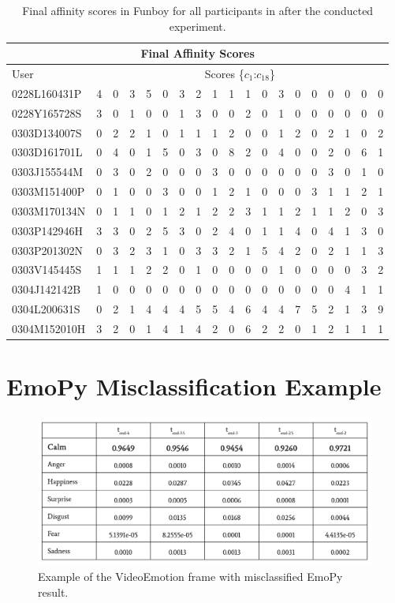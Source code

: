 \begin{table}[hbt!]
\centering
\begin{tabular}{|l|l|l|l|l|l|l|l|l|l|l|l|l|l|l|l|l|l|l|}
\hline
\multicolumn{19}{|c|}{Final Affinity Scores}                                         \\ \hline
User & \multicolumn{18}{c|}{Scores \{\(c_1\):\(c_{18}\)\}}                   \\ \hline
0228L160431P & 4 & 0 & 3 & 5 & 0 & 3 & 2 & 1 & 1 & 1 & 0 & 3 & 0 & 0 & 0 & 0 & 0 & 0 \\ \hline
0228Y165728S & 3 & 0 & 1 & 0 & 0 & 1 & 3 & 0 & 0 & 2 & 0 & 1 & 0 & 0 & 0 & 0 & 0 & 0 \\ \hline
0303D134007S & 0 & 2 & 2 & 1 & 0 & 1 & 1 & 1 & 2 & 0 & 0 & 1 & 2 & 0 & 2 & 1 & 0 & 2 \\ \hline
0303D161701L & 0 & 4 & 0 & 1 & 5 & 0 & 3 & 0 & 8 & 2 & 0 & 4 & 0 & 0 & 2 & 0 & 6 & 1 \\ \hline
0303J155544M & 0 & 3 & 0 & 2 & 0 & 0 & 0 & 3 & 0 & 0 & 0 & 0 & 0 & 0 & 3 & 0 & 1 & 0 \\ \hline
0303M151400P & 0 & 1 & 0 & 0 & 3 & 0 & 0 & 1 & 2 & 1 & 0 & 0 & 0 & 3 & 1 & 1 & 2 & 1 \\ \hline
0303M170134N & 0 & 1 & 1 & 0 & 1 & 2 & 1 & 2 & 2 & 3 & 1 & 1 & 2 & 1 & 1 & 2 & 0 & 3 \\ \hline
0303P142946H & 3 & 3 & 0 & 2 & 5 & 3 & 0 & 2 & 4 & 0 & 1 & 1 & 4 & 0 & 4 & 1 & 3 & 0 \\ \hline
0303P201302N & 0 & 3 & 2 & 3 & 1 & 0 & 3 & 3 & 2 & 1 & 5 & 4 & 2 & 0 & 2 & 1 & 1 & 3 \\ \hline
0303V145445S & 1 & 1 & 1 & 2 & 2 & 0 & 1 & 0 & 0 & 0 & 0 & 1 & 0 & 0 & 0 & 0 & 3 & 2 \\ \hline
0304J142142B & 1 & 0 & 0 & 0 & 0 & 0 & 0 & 0 & 0 & 0 & 0 & 0 & 0 & 0 & 0 & 4 & 1 & 1 \\ \hline
0304L200631S & 0 & 2 & 1 & 4 & 4 & 4 & 5 & 5 & 4 & 6 & 4 & 4 & 7 & 5 & 2 & 1 & 3 & 9 \\ \hline
0304M152010H & 3 & 2 & 0 & 1 & 4 & 1 & 4 & 2 & 0 & 6 & 2 & 2 & 0 & 1 & 2 & 1 & 1 & 1 \\ \hline
\end{tabular}
\caption{Final affinity scores in Funboy for all participants in after the conducted experiment.}
\label{table:fas1}
\end{table}

\chapter{EmoPy Misclassification Example}\label{appendix:emopy}

\begin{figure}[htpb]
  \centering
  \includegraphics[width=1.0\textwidth]{figures/emopymis.png}
  \caption{Example of the VideoEmotion frame with misclassified EmoPy result.} \label{fig:vimm}
\end{figure}

